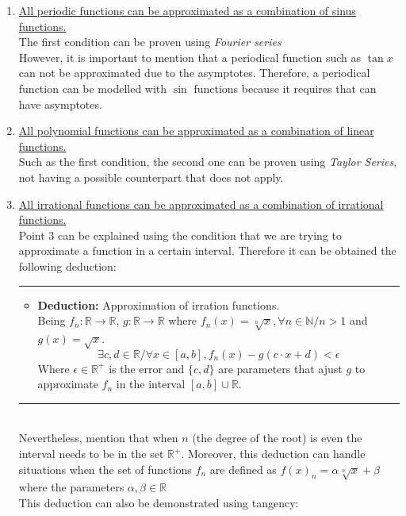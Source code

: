\documentclass[a4paper, 11pt]{article}
\begin{document}
\begin{enumerate}
    \item \underline{All periodic functions can be approximated as a combination of sinus functions.}\\
 The first condition can be proven using \textit{Fourier series}\\
 However, it is important to mention that a periodical function such as $\tan{x}$ can not be approximated due to the asymptotes. 
 Therefore, a periodical function can be modelled with $\sin$ functions because it requires that can have asymptotes.\\
    \item \underline{All polynomial functions can be approximated as a combination of linear functions.}\\
 Such as the first condition, the second one can be proven using \textit{Taylor Series}, not having a possible counterpart that does not apply.\\
    \item \underline{All irrational functions can be approximated as a combination of irrational functions.}\\
 Point 3 can be explained using the condition that we are trying to approximate a function in a certain interval. Therefore it can be obtained the following deduction:\\
    \rule{\linewidth}{0.4pt}
    \begin{itemize}
        \item \textbf{Deduction:} Approximation of irration functions.\\
 Being $f_n:\mathbb{R}\rightarrow\mathbb{R}$, $g:\mathbb{R}\rightarrow\mathbb{R}$ where $f_n(x) = \sqrt[n]{x}, \forall n \in \mathbb{N} / n > 1$ and $g(x) = \sqrt{x}$.\\
        $$ \exists c,d \in \mathbb{R} / \forall x \in [a,b], f_n(x)- g(c\cdot x + d) < \epsilon$$ 
 Where $\epsilon\in\mathbb{R^+}$ is the error and $\{ c,d \}$ are parameters that ajust $g$ to approximate $f_n$ in the interval $[a,b]\cup \mathbb{R}$.
    \end{itemize}
    \rule{\linewidth}{0.4pt}\\
 Nevertheless, mention that when $n$ (the degree of the root) is even the interval needs to be in the set $\mathbb{R^+}$. Moreover, this deduction can handle situations when the set of functions $f_n$ are defined as $f(x)_n = \alpha \sqrt[n]{x} + \beta$ where the parameters $\alpha,\beta \in \mathbb{R}$ \\
 This deduction can also be demonstrated using tangency:\\

\end{enumerate}
\end{document}
